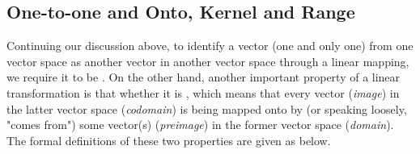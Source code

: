 \subsection{One-to-one and Onto, Kernel and Range}

Continuing our discussion above, to identify a vector (one and only one) from one vector space as another vector in another vector space through a linear mapping, we require it to be . On the other hand, another important property of a linear transformation is that whether it is , which means that every vector (\textit{image}) in the latter vector space (\textit{codomain}) is being mapped onto by (or speaking loosely, "comes from") some vector(s) (\textit{preimage}) in the former vector space (\textit{domain}). The formal definitions of these two properties are given as below.

